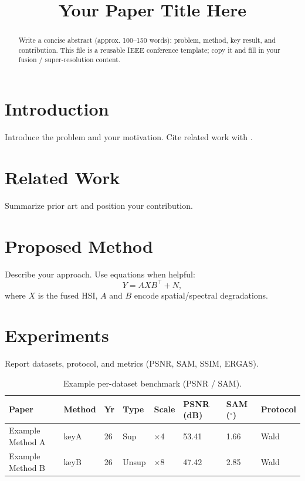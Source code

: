 \documentclass[conference]{IEEEtran}
\title{Your Paper Title Here}
\author{
\IEEEauthorblockN{Author One, Author Two, Author Three}
\IEEEauthorblockA{Department / University\\
City, Country\\
email@univ.edu}
}
\begin{document}
\maketitle

\begin{abstract}
Write a concise abstract (approx. 100--150 words): problem, method, key result,
and contribution. This file is a reusable IEEE conference template; copy it and
fill in your fusion / super-resolution content.
\end{abstract}

\section{Introduction}
Introduce the problem and your motivation. Cite related work with \cite{ref1}.

\section{Related Work}
Summarize prior art and position your contribution.

\section{Proposed Method}
Describe your approach. Use equations when helpful:
\begin{equation}
\label{eq:model}
Y = A X B^{\top} + N ,
\end{equation}
where $X$ is the fused HSI, $A$ and $B$ encode spatial/spectral degradations.

\section{Experiments}
Report datasets, protocol, and metrics (PSNR, SAM, SSIM, ERGAS).

\begin{table}[t]
\centering
\caption{Example per-dataset benchmark (PSNR / SAM).}
\label{tab:benchmark}
\small
\begin{tabular}{@{}p{3.2cm}p{2.0cm}p{0.8cm}p{1.7cm}p{1.1cm}p{1.3cm}p{1.1cm}p{2.2cm}@{}}
\toprule
Paper & Method & Yr & Type & Scale & PSNR (dB) & SAM ($^\circ$) & Protocol \\
\midrule
Example Method A & keyA & 26 & Sup & $\times$4 & 53.41 & 1.66 & Wald \\
Example Method B & keyB & 26 & Unsup & $\times$8 & 47.42 & 2.85 & Wald \\
\bottomrule
\end{tabular}
\end{table}
\end{document}
